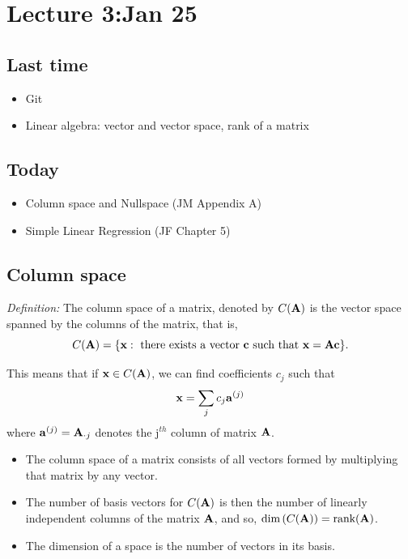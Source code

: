 \setcounter{section}{2}

\section{Lecture 3:Jan 25}


\subsection*{Last time}
\begin{itemize}
\item Git
\item Linear algebra: vector and vector space, rank of a matrix
\end{itemize}


\subsection*{Today}
\begin{itemize}
\item Column space and Nullspace (JM Appendix A)
\item Simple Linear Regression (JF Chapter 5)
\end{itemize}

\subsection*{Column space}

{\it Definition:} The column space of a matrix, denoted by $\mathnormal{C}(\mathbf{A})$ is the vector space spanned by the columns of the matrix, that is,
$$
\mathnormal{C}(\mathbf{A}) = \{\mathbf{x} : \mbox{ there exists a vector } \mathbf{c} \mbox{ such that } \mathbf{x}=\mathbf{Ac} \}.
$$

This means that if $\mathbf{x} \in \mathnormal{C}(\mathbf{A})$, we can find coefficients $c_j$ such that
$$
\mathbf{x} = \sum\limits_{j}c_j \mathbf{a}^{(j)}
$$
where $\mathbf{a}^{(j)} = \mathbf{A}_{\cdot j}$ denotes the j$^{th}$ column of matrix $\mathbf{A}$.

\begin{itemize}
  \item The column space of a matrix consists of all vectors formed by multiplying that matrix by any vector.
  \item The number of basis vectors for $\mathnormal{C}(\mathbf{A})$ is then the number of linearly independent columns of the matrix $\mathbf{A}$, and so, $\mbox{dim}\left(\mathnormal{C}(\mathbf{A})\right) = \mbox{rank}(\mathbf{A})$.
  \item The dimension of a space is the number of vectors in its basis.
\end{itemize}

